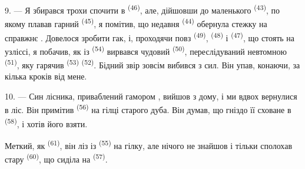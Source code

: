 \VUsaut{3.0mm}
\VUsaut{3.0mm}

9. --- Я збирався трохи спочити в  \textsuperscript{(46)},
але, дійшовши до маленького  \textsuperscript{(43)}, по якому
плавав гарний  \textsuperscript{(45)}, я помітив, що недавня
 \textsuperscript{(44)} обернула стежку на справжнє
. Довелося зробити гак, і, проходячи повз 
\textsuperscript{(49)},  \textsuperscript{(48)} і 
\textsuperscript{(47)}, що стоять на узліссі, я побачив, як із 
\textsuperscript{(54)} вирвався чудовий  \textsuperscript{(50)},
переслідуваний невтомною  \textsuperscript{(51)}, яку гарячив
 \textsuperscript{(53)} 
\textsuperscript{(52)}. Бідний звір зовсім вибився з сил. Він упав, конаючи, за
кілька кроків від мене.

10. --- Син лісника, приваблений гамором , вийшов з дому, і ми
вдвох вернулися в ліс. Він примітив  \textsuperscript{(56)} на
гілці старого дуба. Він думав, що гніздо її сховане в 
\textsuperscript{(58)}, і хотів його взяти.

Меткий, як  \textsuperscript{(61)}, він ліз із 
\textsuperscript{(55)} на гілку, але нічого не знайшов і тільки сполохав стару
 \textsuperscript{(60)}, що сиділа на 
\textsuperscript{(57)}.
\VUsaut{4.0mm}
\VUfilet{22mm}
